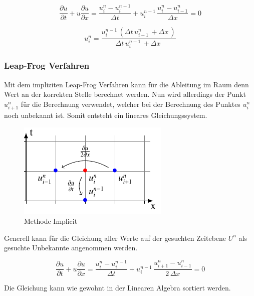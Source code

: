 	\begin{equation}
	\frac {\partial u}{\partial t}+u{\frac {\partial u}{\partial x}} = \frac{u_{i}^{n}-u_{i}^{n-1}}{\Delta t}+ u_{i}^{n-1}\, \frac{u_{i}^{n}-u_{i-1}^{n}}{\Delta x}=0
	\end{equation}
	
	\begin{equation}
	 u_{i}^{n} = \frac{u^{n-1}_{i}\, \left(\Delta{t}\, u^{n}_{i-1}\, + \Delta{x}\,\right)}{\Delta{t}\, u^{n-1}_{i}\, + \Delta{x}\,}
	\end{equation}




\subsubsection{Leap-Frog Verfahren}

	Mit dem impliziten Leap-Frog Verfahren kann f\"ur die Ableitung im Raum denn Wert an der korrekten Stelle berechnet werden.
	Nun wird allerdings der Punkt  $u_{i+1}^{n}$ f\"ur die Berechnung verwendet, welcher bei der Berechnung des Punktes  $u_{i}^{n}$ noch unbekannt ist.
	Somit entsteht ein lineares Gleichungssystem.

     \begin{figure}[!ht]
	\centering
	\includegraphics[height=.4\textwidth]{papers/burgers/BurgersEquation/tikz/implicit/implicit.pdf}
	\caption{Methode Implicit}
	\label{burgers:fig:Implicit}
\end{figure}

Generell kann f\"ur die Gleichung aller Werte auf der gesuchten Zeitebene $U^n$ als gesuchte Unbekannte angenommen werden.

\begin{equation}
\frac {\partial u}{\partial t}+u{\frac {\partial u}{\partial x}} = \frac{u_{i}^{n}-u_{i}^{n-1}}{\Delta t}+ u_{i}^{n-1}\, \frac{u_{i+1}^{n}-u_{i-1}^{n}}{2\,\Delta x}=0
\end{equation}

Die Gleichung kann wie gewohnt in der Linearen Algebra sortiert werden.

